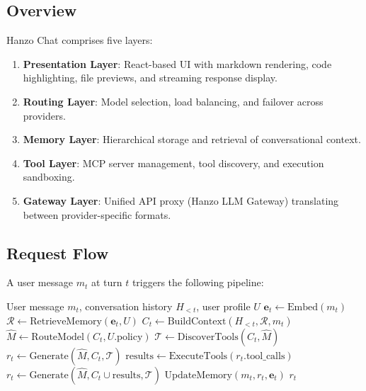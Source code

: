 \documentclass[11pt,twocolumn]{article}
\begin{document}
\subsection{Overview}

Hanzo Chat comprises five layers:

\begin{enumerate}[leftmargin=1.4em]
    \item \textbf{Presentation Layer}: React-based UI with markdown rendering, code highlighting, file previews, and streaming response display.
    \item \textbf{Routing Layer}: Model selection, load balancing, and failover across providers.
    \item \textbf{Memory Layer}: Hierarchical storage and retrieval of conversational context.
    \item \textbf{Tool Layer}: MCP server management, tool discovery, and execution sandboxing.
    \item \textbf{Gateway Layer}: Unified API proxy (Hanzo LLM Gateway) translating between provider-specific formats.
\end{enumerate}

\subsection{Request Flow}

A user message $m_t$ at turn $t$ triggers the following pipeline:

\begin{algorithm}[H]
\caption{Hanzo Chat Request Pipeline}
\label{alg:pipeline}
\begin{algorithmic}[1]
\Require User message $m_t$, conversation history $H_{<t}$, user profile $U$
\State $\bm{e}_t \gets \text{Embed}(m_t)$ 
\State $\mathcal{R} \gets \text{RetrieveMemory}(\bm{e}_t, U)$ 
\State $C_t \gets \text{BuildContext}(H_{<t}, \mathcal{R}, m_t)$ 
\State $\hat{M} \gets \text{RouteModel}(C_t, U.\text{policy})$ 
\State $\mathcal{T} \gets \text{DiscoverTools}(C_t, \hat{M})$ 
\State $r_t \gets \text{Generate}(\hat{M}, C_t, \mathcal{T})$ 
    \State $\text{results} \gets \text{ExecuteTools}(r_t.\text{tool\_calls})$
    \State $r_t \gets \text{Generate}(\hat{M}, C_t \cup \text{results}, \mathcal{T})$
\EndWhile
\State $\text{UpdateMemory}(m_t, r_t, \bm{e}_t)$
\State \Return $r_t$
\end{algorithmic}
\end{algorithm}
\end{document}
